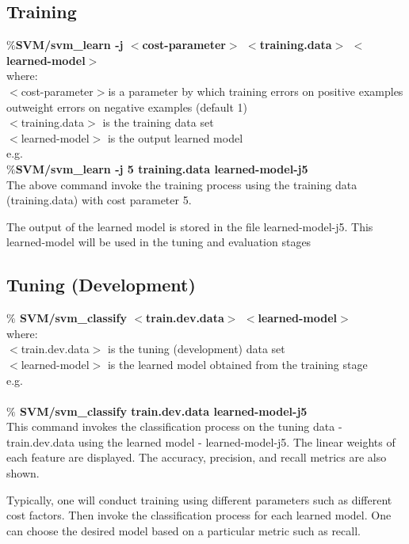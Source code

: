 \documentclass[10pt]{article}
\begin{document}
\subsection{Training}

{\bf $\% $SVM/svm\_learn -j $<$cost-parameter$>$ $<$training.data$>$
$<$learned-model$>$}
\\
where:\\
$<$cost-parameter$>$is a parameter by which training errors on
positive examples outweight errors on negative examples (default
1)
\\
$<$training.data$>$ is the training data set\\
$<$learned-model$>$ is the output learned model
\\
e.g.\\
{\bf $\% $SVM/svm\_learn -j 5 training.data learned-model-j5}
\\

The above command invoke the training process using the training
data (training.data) with cost parameter 5.

The output of the learned model is stored in the file
learned-model-j5.  This learned-model will be used in the tuning and
evaluation stages



\subsection{Tuning (Development)}
{\bf $\%$ SVM/svm\_classify $<$train.dev.data$>$
$<$learned-model$>$}\\
where:\\
$<$train.dev.data$>$ is the tuning (development) data set\\
$<$learned-model$>$ is the learned model obtained from the
training stage\\
e.g.\\
\\
{\bf $\%$ SVM/svm\_classify train.dev.data learned-model-j5 }
\\

This command invokes the classification process on the
tuning data - train.dev.data using the learned model -
learned-model-j5.
The linear weights of each feature are displayed.
The accuracy, precision, and recall metrics are also shown.

Typically, one will conduct training using different parameters
such as different cost factors.  Then invoke the classification
process for each learned model.  One can choose the desired
model based on a particular metric such as recall.
\end{document}
